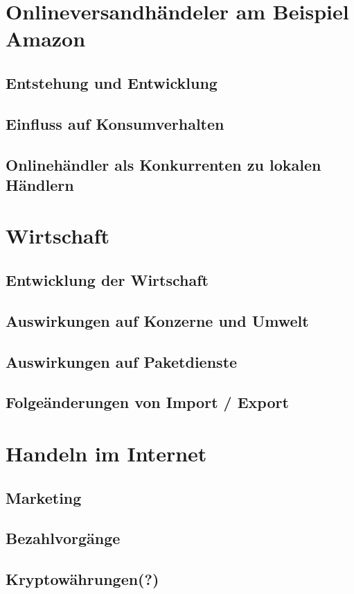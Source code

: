 \documentclass[a4paper, 10pt]{scrartcl}
\begin{document}
    
    \section{Onlineversandhändeler am Beispiel Amazon}
        \subsection{Entstehung und Entwicklung}
            
            
        \subsection{Einfluss auf Konsumverhalten }
            
            
        \subsection{Onlinehändler als Konkurrenten zu lokalen Händlern}
            
            
        
    \section{Wirtschaft}
        \subsection{Entwicklung der Wirtschaft}
        \subsection{Auswirkungen auf Konzerne und Umwelt}
        \subsection{Auswirkungen auf Paketdienste}
        \subsection{Folgeänderungen von Import / Export}
        
    \section{Handeln im Internet}
        \subsection{Marketing}
        \subsection{Bezahlvorgänge}
        \subsection{Kryptowährungen(?)}
\end{document}
